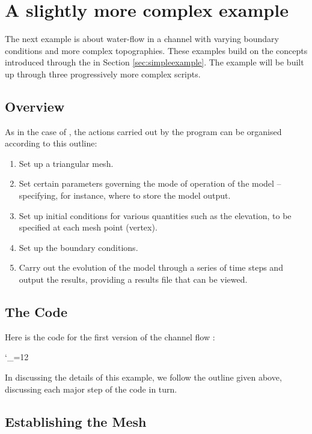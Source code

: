 \documentclass{manual}
\newcommand{\verbatiminputB}[1]{%
\endgroup}
\def\verbatiminputunderscore{\begingroup 
\catcode`\_=12
\verbatiminputB}
\begin{document}
\clearpage


\chapter{A slightly more complex example}
\label{sec:channelexample}


The next example is about water-flow in a channel with varying boundary conditions and
more complex topographies. These examples build on the
concepts introduced through the  in Section \ref{sec:simpleexample}.
The example will be built up through three progressively more complex scripts.

\section{Overview}

As in the case of , the actions carried
out by the program can be organised according to this outline:
\begin{enumerate}
   \item Set up a triangular mesh.
   \item Set certain parameters governing the mode of
         operation of the model -- specifying, for instance, where to store the
         model output.
   \item Set up initial conditions for various quantities such as the elevation, to be specified at each mesh point (vertex).
   \item Set up the boundary conditions.
   \item Carry out the evolution of the model through a series of time
         steps and output the results, providing a results file that can be
         viewed.
\end{enumerate}

\section{The Code}

Here is the code for the first version of the channel flow :

\verbatiminputunderscore{../../anuga_core/examples/channel1.py}

In discussing the details of this example, we follow the outline
given above, discussing each major step of the code in turn.

\section{Establishing the Mesh}
\end{document}
